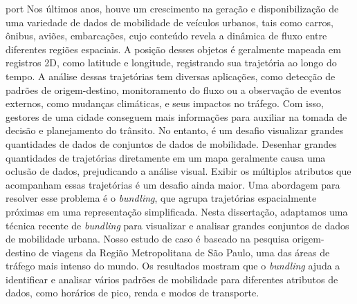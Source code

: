 
\begin{resumo}{port}
  Nos últimos anos, houve um crescimento na geração e disponibilização de uma
variedade de dados de mobilidade de veículos urbanos, tais como carros, ônibus,
aviões, embarcações, cujo conteúdo revela a dinâmica de fluxo entre diferentes
regiões espaciais. A posição desses objetos é geralmente mapeada em registros
2D, como latitude e longitude, registrando sua trajetória ao longo do tempo. A
análise dessas trajetórias tem diversas aplicações, como detecção de padrões de
origem-destino, monitoramento do fluxo ou a observação de eventos externos, como
mudanças climáticas, e seus impactos no tráfego. Com isso, gestores de uma
cidade conseguem mais informações para auxiliar na tomada de decisão e
planejamento do trânsito. No entanto, é um desafio visualizar grandes
quantidades de dados de conjuntos de dados de mobilidade. Desenhar grandes
quantidades de trajetórias diretamente em um mapa geralmente causa uma  oclusão
de dados, prejudicando a análise visual. Exibir os múltiplos atributos que
acompanham essas trajetórias é um desafio ainda maior. Uma abordagem para
resolver esse problema é o \emph{bundling}, que agrupa trajetórias espacialmente
próximas em uma representação simplificada. Nesta dissertação, adaptamos uma
técnica recente de \emph{bundling} para visualizar e analisar grandes
conjuntos de dados de mobilidade urbana. Nosso estudo de caso é baseado na
pesquisa origem-destino de viagens da Região Metropolitana de São Paulo, uma das áreas de
tráfego mais intenso do mundo. Os resultados mostram que o \emph{bundling} ajuda
a identificar e analisar vários padrões de mobilidade para diferentes atributos
de dados, como horários de pico, renda e modos de transporte.
\end{resumo}

